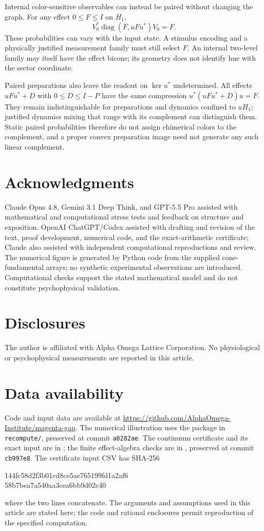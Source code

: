 \documentclass[11pt,letterpaper]{article}
\theoremstyle{plain}
\begin{document}
Internal color-sensitive observables can instead be paired without changing the graph. For any effect $0\leq F\leq I$ on $H_1$,
\begin{equation}
 V_0^*\operatorname{diag}(F,uFu^*)V_0=F.
 \label{eq:paired-internal-effect}
\end{equation}
These probabilities can vary with the input state. A stimulus encoding and a physically justified measurement family must still select $F$. An internal two-level family may itself have the effect bicone; its geometry does not identify hue with the sector coordinate.

Paired preparations also leave the readout on $\ker u^*$ undetermined. All effects $uFu^*+D$ with $0\leq D\leq I-P$ have the same compression $u^*(uFu^*+D)u=F$. They remain indistinguishable for preparations and dynamics confined to $uH_1$; justified dynamics mixing that range with its complement can distinguish them. Static paired probabilities therefore do not assign chimerical colors to the complement, and a proper convex preparation image need not generate any such linear complement.

\section*{Acknowledgments}
Claude Opus 4.8, Gemini 3.1 Deep Think, and GPT-5.5 Pro assisted with mathematical and computational stress tests and feedback on structure and exposition. OpenAI ChatGPT/Codex assisted with drafting and revision of the text, proof development, numerical code, and the exact-arithmetic certificate; Claude also assisted with independent computational reproductions and review. The numerical figure is generated by Python code from the supplied cone-fundamental arrays; no synthetic experimental observations are introduced. Computational checks support the stated mathematical model and do not constitute psychophysical validation.
\section*{Disclosures}
The author is affiliated with Alpha Omega Lattice Corporation. No physiological or psychophysical measurements are reported in this article.
\section*{Data availability}
Code and input data are available at \url{https://github.com/AlphaOmega-Institute/magenta-gap}. The numerical illustration uses the package in \mbox{\texttt{recompute/}}, preserved at commit \texttt{a0282ae}. The continuum certificate and its exact input are in ; the finite effect-algebra checks are in , preserved at commit \texttt{cb997e8}. The certificate input CSV has SHA-256
\begin{center}\scriptsize\ttfamily
144fc58d2f3b01cd8ce5ae765199fd1a2af6\\
58b7bea7a540aa3cea6bb9d02c40
\end{center}
where the two lines concatenate. The arguments and assumptions used in this article are stated here; the code and rational enclosures permit reproduction of the specified computation.
\end{document}
